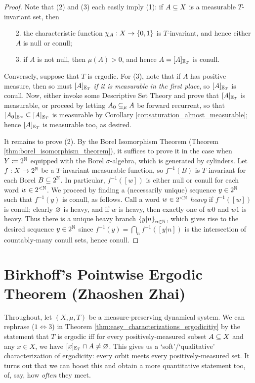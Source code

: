 \documentclass[reqno, twoside]{article}
\begin{document}
    \begin{proof}
        Note that (2) and (3) each easily imply (1): if $A\subseteq X$ is a measurable $T$-invariant set, then
        \begin{enumerate}
            \item[2.] the characteristic function $\chi_A:X\to\left\{0,1\right\}$ is $T$-invariant, and hence either $A$ is null or conull;
                \vspace{-0.05in}
            \item[3.] if $A$ is not null, then $\mu(A)>0$, and hence $A=[A]_{\mathbb{E}_T}$ is conull.
        \end{enumerate}
        Conversely, suppose that $T$ is ergodic. For (3), note that if $A$ has positive measure, then so must $[A]_{\mathbb{E}_T}$ \textit{if it is measurable in the first place}, so $[A]_{\mathbb{E}_T}$ is conull. Now, either invoke some Descriptive Set Theory and prove that $[A]_{\mathbb{E}_T}$ is measurable, or proceed by letting $A_0\subseteq_\mu A$ be forward recurrent, so that $[A_0]_{\mathbb{E}_T}\subseteq[A]_{\mathbb{E}_T}$ is measurable by Corollary \ref{cor:saturation_almost_measurable}; hence $[A]_{\mathbb{E}_T}$ is measurable too, as desired.

        It remains to prove (2). By the Borel Isomorphism Theorem (Theorem \ref{thm:borel_isomorphism_theorem}), it suffices to prove it in the case when $Y\coloneqq2^{\mathbb{N}}$ equipped with the Borel $\sigma$-algebra, which is generated by cylinders. Let $f:X\to2^{\mathbb{N}}$ be a $T$-invariant measurable function, so $f^{-1}(B)$ is $T$-invariant for each Borel $B\subseteq2^{\mathbb{N}}$. In particular, $f^{-1}([w])$ is either null or conull for each word $w\in2^{<\mathbb{N}}$. We proceed by finding a (necessarily unique) sequence $y\in2^{\mathbb{N}}$ such that $f^{-1}(y)$ is conull, as follows. Call a word $w\in2^{<\mathbb{N}}$ \textit{heavy} if $f^{-1}([w])$ is conull; clearly $\varnothing$ is heavy, and if $w$ is heavy, then exactly one of $w0$ and $w1$ is heavy. Thus there is a unique heavy branch $\left\{y|n\right\}_{n\in\mathbb{N}}$, which gives rise to the desired sequence $y\in2^{\mathbb{N}}$ since $f^{-1}(y)=\bigcap_nf^{-1}([y|n])$ is the intersection of countably-many conull sets, hence conull.
    \end{proof}

    \section{Birkhoff's Pointwise Ergodic Theorem (Zhaoshen Zhai)}\label{sec:5}

    Throughout, let $(X,\mu,T)$ be a measure-preserving dynamical system. We can rephrase ($1\Leftrightarrow3$) in Theorem \ref{thm:easy_characterizations_ergodicitiy} by the statement that $T$ is ergodic iff for every positively-measured subset $A\subseteq X$ and any $x\in X$, we have $[x]_{\mathbb{E}_T}\cap A\neq\varnothing$. This gives us a `soft'/`qualitative' characterization of ergodicity: every orbit meets every positively-measured set. It turns out that we can boost this and obtain a more quantitative statement too, of, say, how \textit{often} they meet.
\end{document}
